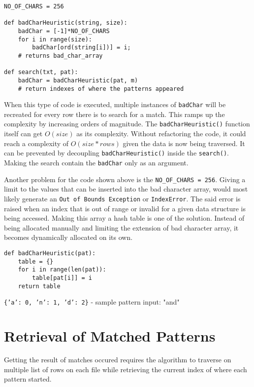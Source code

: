 \hfill

\begin{lstlisting}
NO_OF_CHARS = 256
 
def badCharHeuristic(string, size):
    badChar = [-1]*NO_OF_CHARS
    for i in range(size):
        badChar[ord(string[i])] = i;
    # returns bad_char_array

def search(txt, pat):
    badChar = badCharHeuristic(pat, m)
    # return indexes of where the patterns appeared
\end{lstlisting}

\hfill

When this type of code is executed, multiple instances of \texttt{badChar} will be recreated for
every row there is to search for a match. This ramps up the complexity by increasing orders of
magnitude. The \texttt{badCharHeuristic()} function itself can get $O(size)$ as its complexity.
Without refactoring the code, it could reach a complexity of $O(size*rows)$ given the data is now
being traversed. It can be
prevented by decoupling \texttt{badCharHeuristic()} inside the \texttt{search()}. Making the search
contain the \texttt{badChar} only as an argument.

\hfill

Another problem for the code shown above is the \texttt{NO\_OF\_CHARS = 256}. Giving a limit to the
values that can be inserted into the bad character array, would most likely generate an \texttt{Out
of Bounds Exception} or
\texttt{IndexError}. The said error is raised when an index that is out of range or invalid for
a given data structure is being accessed. Making this array a hash table is one of the solution. Instead of being
allocated manually and limiting the extension of bad character array, it becomes dynamically allocated on its own.

\hfill

\begin{lstlisting}
def badCharHeuristic(pat):
    table = {}
    for i in range(len(pat)):
        table[pat[i]] = i
    return table
\end{lstlisting}

\noindent
\texttt{\{'a': 0, 'n': 1, 'd': 2\}} - sample pattern input: "and"

\hfill

\section*{Retrieval of Matched Patterns}
Getting the result of matches occured requires the algorithm to traverse on multiple list of
rows on each file while retrieving the current index of where each pattern started.

